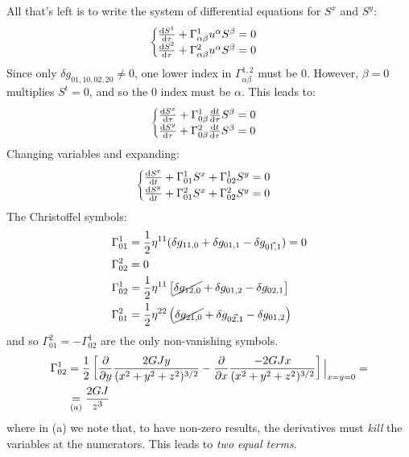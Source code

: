 \documentclass[../template.tex]{subfiles}
\begin{document}
All that's left is to write the system of differential equations for $S^x$ and $S^y$:
\begin{align*}
    \begin{cases}
        \dv{S^1}{\tau} + \Gamma_{\alpha \beta}^1 u^\alpha S^\beta = 0\\
        \dv{S^2}{\tau} + \Gamma_{\alpha \beta}^2 u^\alpha S^\beta = 0
    \end{cases}
\end{align*}   
Since only $\delta g_{01,10,02,20} \neq 0$, one lower index in $\Gamma^{1,2}_{\alpha \beta}$ must be $0$. However, $\beta = 0$ multiplies $S^t = 0$, and so the $0$ index must be $\alpha$. This leads to:
\begin{align*}
    \begin{cases}
        \dv{S^x}{\tau} + \Gamma^1_{0 \beta} \dv{t}{\tau} S^\beta = 0\\
        \dv{S^y}{\tau} + \Gamma^2_{0 \beta} \dv{t}{\tau} S^\beta = 0
    \end{cases}
\end{align*}      
Changing variables and expanding:
\begin{align*}
    \begin{cases}
        \dv{S^x}{t} + \Gamma^1_{01} S^x + \Gamma^1_{02} S^y = 0\\
        \dv{S^y}{t} + \Gamma_{01}^2 S^x + \Gamma^2_{02} S^y = 0
    \end{cases}
\end{align*}
The Christoffel symbols:
\begin{align*}
    \Gamma^1_{01} &= \frac{1}{2} \eta^{11} (\delta g_{11,0} + \delta g_{01,1} - \delta g_{\vec{01,1}}) = 0\\
    \Gamma^2_{02} &= 0\\
    \Gamma^1_{02} &= \frac{1}{2} \eta^{11} \left[ \cancel{\delta g_{12,0} }+ \delta g_{01,2} - \delta g_{02,1}\right] \\
    \Gamma^2_{01} &= \frac{1}{2} \eta^{22} \left(\cancel{\delta g_{21, 0}} + \delta g_{\vec{02,1}} - \delta g_{01,2}\right) 
\end{align*}
and so $\Gamma_{01}^2 = - \Gamma_{02}^1$ are the only non-vanishing symbols.
\begin{align*}
    \Gamma_{02}^1 &= \frac{1}{2} \left[\pdv{y} \frac{2G J y}{(x^2 +y^2 + z^2)^{3/2}} - \pdv{x} \frac{-2GJx}{(x^2 + y^2 +z^2)^{3/2}}  \right] \Big|_{x=y=0} = \\
    &\underset{(a)}{=} \frac{2GJ}{z^3} 
\end{align*} 
where in (a) we note that, to have non-zero results, the derivatives must \textit{kill} the variables at the numerators. This leads to \textit{two equal terms}.  
\end{document}
